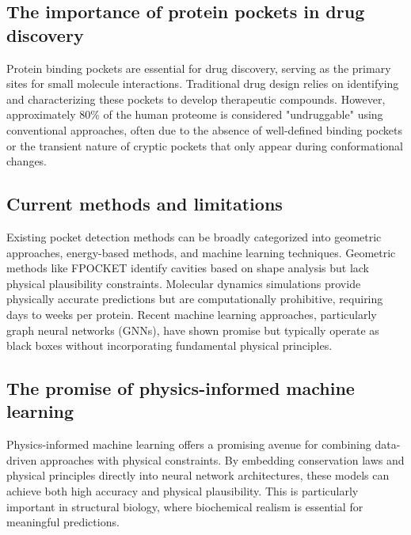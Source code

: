 \subsection*{The importance of protein pockets in drug discovery}
Protein binding pockets are essential for drug discovery, serving as the primary sites for small molecule interactions. Traditional drug design relies on identifying and characterizing these pockets to develop therapeutic compounds. However, approximately 80\% of the human proteome is considered "undruggable" using conventional approaches, often due to the absence of well-defined binding pockets or the transient nature of cryptic pockets that only appear during conformational changes.

\subsection*{Current methods and limitations}
Existing pocket detection methods can be broadly categorized into geometric approaches, energy-based methods, and machine learning techniques. Geometric methods like FPOCKET \cite{le2009fpocket} identify cavities based on shape analysis but lack physical plausibility constraints. Molecular dynamics simulations provide physically accurate predictions but are computationally prohibitive, requiring days to weeks per protein. Recent machine learning approaches, particularly graph neural networks (GNNs), have shown promise but typically operate as black boxes without incorporating fundamental physical principles.

\subsection*{The promise of physics-informed machine learning}
Physics-informed machine learning offers a promising avenue for combining data-driven approaches with physical constraints. By embedding conservation laws and physical principles directly into neural network architectures, these models can achieve both high accuracy and physical plausibility. This is particularly important in structural biology, where biochemical realism is essential for meaningful predictions.

